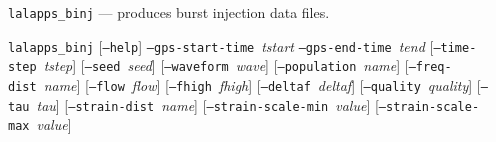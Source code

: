 \documentclass[10pt]{article}
\newcommand{\prog}[1]{\texttt{#1}}
\newcommand{\option}[1]{\texttt{#1}}
\newcommand{\parm}[1]{\textit{#1}}
\newenvironment{entry}%
{\begin{list}{}{\renewcommand{\makelabel}[1]%
{\parbox[b]{\labelwidth}{\makebox[0pt][l]{\textbf{##1}}\\}}%
\setlength{\labelwidth}{1em}%
\setlength{\labelsep}{1em}%
\setlength{\leftmargin}{2em}%
\setlength{\topsep}{\medskipamount}%
\setlength{\itemsep}{\medskipamount}%
\setlength{\parsep}{\medskipamount}%
\setlength{\listparindent}{0pt}}}
{\end{list}}
\begin{document}
\begin{entry}
\item[Name]
\prog{lalapps\_binj} --- produces burst injection data files.

\item[Synopsis]
\prog{lalapps\_binj} \newline \hspace*{0.5in}
[\option{--help}] \newline \hspace*{0.5in}
\option{--gps-start-time}~\parm{tstart} \newline \hspace*{0.5in}
\option{--gps-end-time}~\parm{tend} \newline \hspace*{0.5in}
[\option{--time-step}~\parm{tstep}] \newline \hspace*{0.5in}
[\option{--seed}~\parm{seed}] \newline \hspace*{0.5in}
[\option{--waveform}~\parm{wave}] \newline \hspace*{0.5in}
[\option{--population}~\parm{name}] \newline \hspace*{0.5in}
[\option{--freq-dist}~\parm{name}] \newline \hspace*{0.5in}
[\option{--flow}~\parm{flow}] \newline \hspace*{0.5in}
[\option{--fhigh}~\parm{fhigh}] \newline \hspace*{0.5in}
[\option{--deltaf}~\parm{deltaf}] \newline \hspace*{0.5in}
[\option{--quality}~\parm{quality}] \newline \hspace*{0.5in}
[\option{--tau}~\parm{tau}] \newline \hspace*{0.5in}
[\option{--strain-dist}~\parm{name}] \newline \hspace*{0.5in}
[\option{--strain-scale-min}~\parm{value}] \newline \hspace*{0.5in}
[\option{--strain-scale-max}~\parm{value}] \newline \hspace*{0.5in}

\end{entry}
\end{document}
